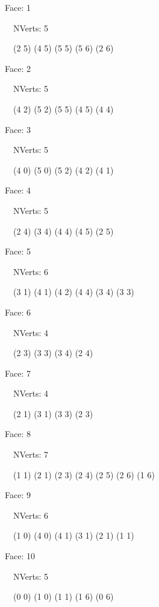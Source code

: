 \documentclass{article}
\begin{document}
{\footnotesize 

Face: 1

\   \    NVerts: 5

 \   \   (2 5) (4 5) (5 5) (5 6) (2 6)}

{\footnotesize 

Face: 2

\   \    NVerts: 5

 \   \   (4 2) (5 2) (5 5) (4 5) (4 4)}

{\footnotesize 

Face: 3

\   \    NVerts: 5

 \   \   (4 0) (5 0) (5 2) (4 2) (4 1)}

{\footnotesize 

Face: 4

\   \    NVerts: 5

 \   \   (2 4) (3 4) (4 4) (4 5) (2 5)}

{\footnotesize 

Face: 5

\   \    NVerts: 6

 \   \   (3 1) (4 1) (4 2) (4 4) (3 4) (3 3)}

{\footnotesize 

Face: 6

\   \    NVerts: 4

 \   \   (2 3) (3 3) (3 4) (2 4)}

{\footnotesize 

Face: 7

\   \    NVerts: 4

 \   \   (2 1) (3 1) (3 3) (2 3)}

{\footnotesize 

Face: 8

\   \    NVerts: 7

 \   \   (1 1) (2 1) (2 3) (2 4) (2 5) (2 6) (1 6)}

{\footnotesize 

Face: 9

\   \    NVerts: 6

 \   \   (1 0) (4 0) (4 1) (3 1) (2 1) (1 1)}

{\footnotesize 

Face: 10

\   \    NVerts: 5

 \   \   (0 0) (1 0) (1 1) (1 6) (0 6)}


 \newpage
\end{document}
